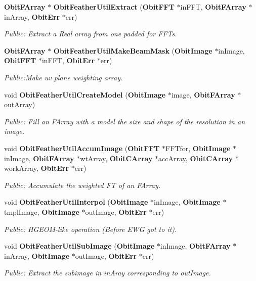 \begin{CompactItemize}
{\bf Obit\-FArray} $\ast$ {\bf Obit\-Feather\-Util\-Extract} ({\bf Obit\-FFT} $\ast$in\-FFT, {\bf Obit\-FArray} $\ast$in\-Array, {\bf Obit\-Err} $\ast$err)
\begin{CompactList}\small\item\em Public: Extract a Real array from one padded for FFTs. \item\end{CompactList}\item 
{\bf Obit\-FArray} $\ast$ {\bf Obit\-Feather\-Util\-Make\-Beam\-Mask} ({\bf Obit\-Image} $\ast$in\-Image, {\bf Obit\-FFT} $\ast$in\-FFT, {\bf Obit\-Err} $\ast$err)
\begin{CompactList}\small\item\em Public:Make uv plane weighting array. \item\end{CompactList}\item 
void {\bf Obit\-Feather\-Util\-Create\-Model} ({\bf Obit\-Image} $\ast$image, {\bf Obit\-FArray} $\ast$out\-Array)
\begin{CompactList}\small\item\em Public: Fill an FArray with a model the size and shape of the resolution in an image. \item\end{CompactList}\item 
void {\bf Obit\-Feather\-Util\-Accum\-Image} ({\bf Obit\-FFT} $\ast$FFTfor, {\bf Obit\-Image} $\ast$in\-Image, {\bf Obit\-FArray} $\ast$wt\-Array, {\bf Obit\-CArray} $\ast$acc\-Array, {\bf Obit\-CArray} $\ast$work\-Array, {\bf Obit\-Err} $\ast$err)
\begin{CompactList}\small\item\em Public: Accumulate the weighted FT of an FArray. \item\end{CompactList}\item 
void {\bf Obit\-Feather\-Util\-Interpol} ({\bf Obit\-Image} $\ast$in\-Image, {\bf Obit\-Image} $\ast$tmpl\-Image, {\bf Obit\-Image} $\ast$out\-Image, {\bf Obit\-Err} $\ast$err)
\begin{CompactList}\small\item\em Public: HGEOM-like operation (Before EWG got to it). \item\end{CompactList}\item 
void {\bf Obit\-Feather\-Util\-Sub\-Image} ({\bf Obit\-Image} $\ast$in\-Image, {\bf Obit\-FArray} $\ast$in\-Array, {\bf Obit\-Image} $\ast$out\-Image, {\bf Obit\-Err} $\ast$err)
\begin{CompactList}\small\item\em Public: Extract the subimage in in\-Aray corresponding to out\-Image. \item\end{CompactList}\end{CompactItemize}


